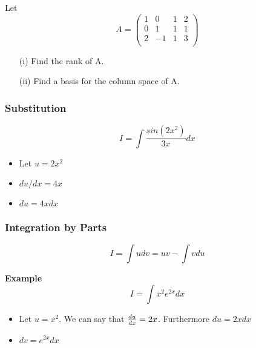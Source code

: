 \documentclass{beamer}
\begin{document}
			\begin{frame}
				Let
		\[A = \left(
		\begin{array}{cccc}
		1 &0 &1& 2\\
		0 &1 &1 &1\\
		2 &-1& 1 &3\\
		\end{array}
		\right)
		\]
		\begin{itemize}
			\item[(i)] Find the rank of A.
			\item[(ii)] Find a basis for the column space of A.
		\end{itemize}
		
		
		
		
		
		
		
		
			\end{frame}
			\begin{frame}
		\frametitle{Substitution}
		
		\[ I= \int  \frac{sin(2x^2)}{3x} dx \]
		
		\begin{itemize}
			\item Let $u = 2x^2$
			\item $du/dx = 4x$
			\item $du =4x dx$
		\end{itemize}
			\end{frame}
			\begin{frame}
		
		\frametitle{Integration by Parts}
		
		\[ I= \int udv = uv -  \int vdu \]
		
		\textbf{Example}
		\[ I= \int x^2 e^{2x} dx \]
		
		\begin{itemize}
			\item Let $u = x^2 $. We can say that ${ du \over dx} = 2x$. Furthermore $du=2xdx$
			\item $dv  = e^{2x} dx$
		\end{itemize}
		
		
		
		
		
		
			\end{frame}
\end{document}
